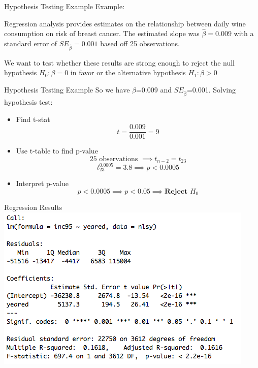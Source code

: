 \documentclass{beamer}
\begin{document}
\begin{frame}{Hypothesis Testing Example}
	Example:
	
	Regression analysis provides estimates on the relationship between daily wine consumption on risk of breast cancer. The estimated slope was $\hat{\beta} = 0.009$ with a standard error of $SE_{\hat{\beta}} = 0.001$ based off 25 observations. 
	
	We want to test whether these results are strong enough to reject the null hypothesis $H_0: \beta = 0 $ in favor or the alternative hypothesis $H_1: \beta > 0$
	
	
\end{frame}

\begin{frame}{Hypothesis Testing Example}
	So we have $\hat{\beta}$=0.009 and $SE_{\hat{\beta}}$=0.001.
	Solving hypothesis test:

	\begin{itemize}
		\item Find t-stat \[ 
				t=\frac{0.009}{0.001}=9 
			\]

		\item Use t-table to find p-value \[ 
				25 \text{ observations } \implies t_{n-2} = t_{23} 
			\]
			\[ 
				t_{23}^{0.0005}=3.8 \implies p<0.0005 
			\]

		\item Interpret p-value \[ 
				p<0.0005 \implies p<0.05 \implies \textbf{Reject $H_0$} 
			\]
	\end{itemize}
\end{frame}

\begin{frame}{Regression Results}
	\includegraphics[width=\textwidth]{regression_results}
\end{frame}
\end{document}
